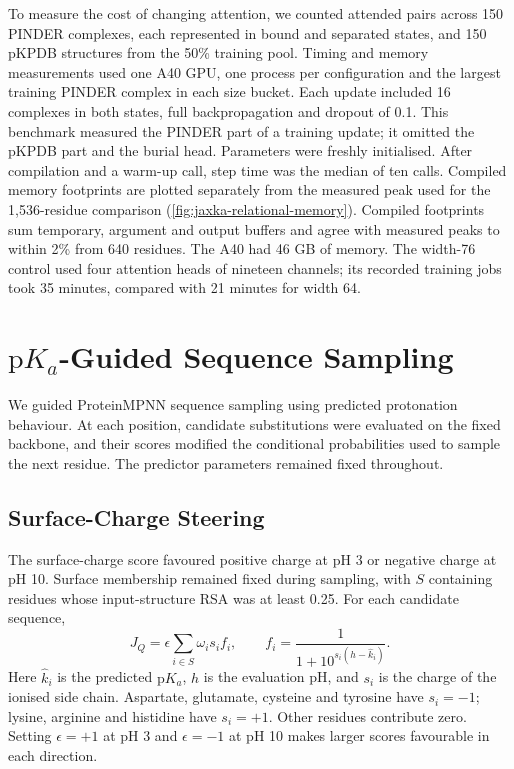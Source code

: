 


To measure the cost of changing attention, we counted attended pairs across 150 PINDER complexes, each represented in bound and separated states, and 150 pKPDB structures from the 50\% training pool. Timing and memory measurements used one A40 GPU, one process per configuration and the largest training PINDER complex in each size bucket. Each update included 16 complexes in both states, full backpropagation and dropout of 0.1. This benchmark measured the PINDER part of a training update; it omitted the pKPDB part and the burial head. Parameters were freshly initialised. After compilation and a warm-up call, step time was the median of ten calls. Compiled memory footprints are plotted separately from the measured peak used for the 1,536-residue comparison (\cref{fig:jaxka-relational-memory}). Compiled footprints sum temporary, argument and output buffers and agree with measured peaks to within 2\% from 640 residues. The A40 had 46 GB of memory. The width-76 control used four attention heads of nineteen channels; its recorded training jobs took 35 minutes, compared with 21 minutes for width 64.



\clearpage

\section{\texorpdfstring{$\mathrm{p}K_a$}{pKa}-Guided Sequence Sampling}
\label{app:jaxka-sequence-sampling}

We guided ProteinMPNN sequence sampling using predicted protonation behaviour. At each position, candidate substitutions were evaluated on the fixed backbone, and their scores modified the conditional probabilities used to sample the next residue. The predictor parameters remained fixed throughout.

\subsection{Surface-Charge Steering}
\label{app:jaxka-surface-charge}

The surface-charge score favoured positive charge at pH 3 or negative charge at pH 10. Surface membership remained fixed during sampling, with $S$ containing residues whose input-structure RSA was at least 0.25. For each candidate sequence,
\begin{equation}
    J_Q=\epsilon\sum_{i\in S}\omega_i s_i f_i,
    \qquad
    f_i=\frac{1}{1+10^{s_i(h-\hat{k}_i)}}.
    \label{eq:jaxka-surface-charge}
\end{equation}
Here $\hat{k}_i$ is the predicted $\mathrm{p}K_a$, $h$ is the evaluation pH, and $s_i$ is the charge of the ionised side chain. Aspartate, glutamate, cysteine and tyrosine have $s_i=-1$; lysine, arginine and histidine have $s_i=+1$. Other residues contribute zero. Setting $\epsilon=+1$ at pH 3 and $\epsilon=-1$ at pH 10 makes larger scores favourable in each direction.

